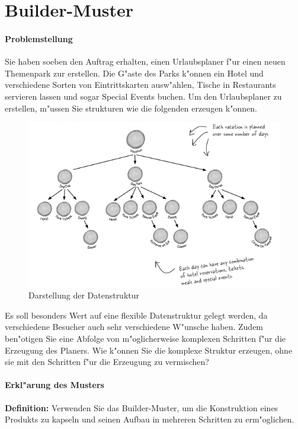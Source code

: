 \section{Builder-Muster}

\paragraph{Problemstellung}
Sie haben soeben den Auftrag erhalten, einen Urlaubsplaner f"ur einen neuen Themenpark zur erstellen. Die G"aste des Parks k"onnen ein Hotel und verschiedene Sorten von Eintrittskarten ausw"ahlen, Tische in Restaurants servieren lassen und sogar Special Events buchen. Um den Urlaubsplaner zu erstellen, m"ussen Sie strukturen wie die folgenden erzeugen k"onnen. 

\begin{figure} [!htb]
	\centering
	\includegraphics[width=.9\linewidth]{builder/img/builder}
	\caption{Darstellung der Datenstruktur}
	\label{fig:builder}
\end{figure}

Es soll besonders Wert auf eine flexible Datenstruktur gelegt werden, da verschiedene Besucher auch sehr verschiedene W"unsche haben. Zudem ben"otigen Sie eine Abfolge von m"oglicherweise komplexen Schritten f"ur die Erzeugung des Planers. Wie k"onnen Sie die komplexe Struktur erzeugen, ohne sie mit den Schritten f"ur die Erzeugung zu vermischen?


\paragraph{Erkl"arung des Musters}
\textbf{Definition:} Verwenden Sie das Builder-Muster, um die Konstruktion eines Produkts zu kapseln und seinen Aufbau in mehreren Schritten zu erm"oglichen.

